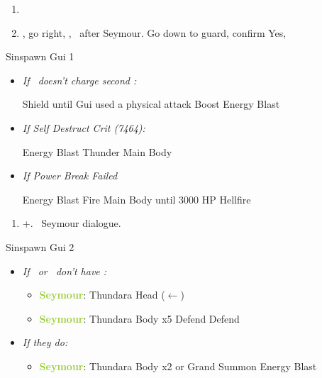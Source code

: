 \begin{enumerate}[resume]
  \item \save
  \item \sd, go right, \cs[1:00], \sd\ after Seymour. Go down to guard, confirm Yes, \sd
\end{enumerate}
\begin{battle}[12000]{Sinspawn Gui 1}
  \begin{itemize}
    \switch{\yuna}{\auron}
    \auronf Power Break Main Body
    \tidusf Defend
    \wakkaf Switch Weapon to Thunder Ball, Power Ball, or Official Ball
    \switch{\wakka}{\kimahri}
    \kimahrif Self Destruct main body
    \switch{\tidus}{\yuna}
    \summon{\valefor}
    \valeforf Energy Blast \od\ x2
    \item \textit{If \valefor\ doesn't charge second \od:}
          \begin{itemize}
            \valeforf Shield until Gui used a physical attack
            \valeforf Boost
            \valeforf Energy Blast \od
          \end{itemize}
  \item \textit{If Self Destruct Crit \textit{(7464)}:}
  	\begin{itemize}
  		\valeforf Energy Blast
  		\valeforf Thunder Main Body
	\end{itemize}
  \item \textit{If Power Break Failed}
  	\begin{itemize}
  		\valeforf Energy Blast
  		\summon{\ifrit}
  		\ifritf Fire Main Body until 3000 HP
  		\ifritf Hellfire
	\end{itemize}
  \end{itemize}
\end{battle}
\begin{enumerate}[resume]
  \item \cs+\skippablefmv[2:20]. \sd\ Seymour dialogue.
\end{enumerate}
\begin{battle}[6000]{Sinspawn Gui 2}
  \begin{itemize}
  \item \textit{If \yuna\ or \valefor\ don't have \od:}
  \begin{itemize}
    \item \textbf{\textcolor{YellowGreen}{Seymour}}: Thundara Head ($\leftarrow$)
    \item \textbf{\textcolor{YellowGreen}{Seymour}}: Thundara Body x5
          \yunaf Defend
          \auronf Defend
          \end{itemize}
	\item \textit{If they do:}
	\begin{itemize}
	    \item \textbf{\textcolor{YellowGreen}{Seymour}}: Thundara Body x2
	    \summon{\valefor} or Grand Summon \valefor
	    \valeforf Energy Blast
	 \end{itemize}
  \end{itemize}
\end{battle}
